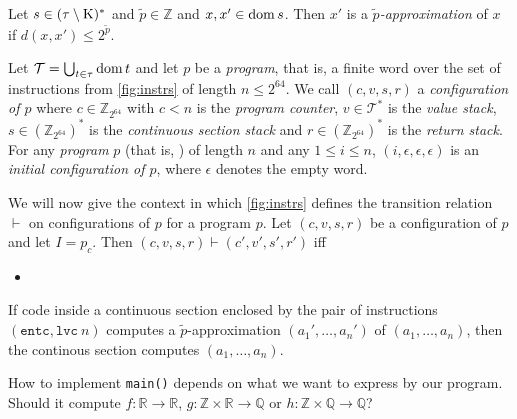 \documentclass[a4paper,parskip=half]{scrartcl}
\begin{document}
Let $s\in(\tau\setminus\text K)^*$ and $\tilde p\in\mathbb Z$ and $x,x'\in\operatorname{dom} s$.
Then $x'$ is a \emph{$\tilde p$-approximation} of $x$ if
$d(x,x')\leq2^{\tilde p}$.

Let $\mathcal T=\bigcup_{t\in\tau}\operatorname{dom} t$ and let $p$ be a \emph{program}, that
is, a finite word over the set of
instructions from \cref{fig:instrs} of length $n\leq 2^{64}$.
We call $(c,v,s,r)$
a \emph{configuration of $p$} where $c\in\mathbb Z_{2^{64}}$ with $c<n$ is the
\emph{program counter}, $v\in\mathcal T^*$ is the
\emph{value stack}, $s\in(\mathbb Z_{2^{64}})^*$ is the \emph{continuous section
stack} and $r\in(\mathbb Z_{2^{64}})^*$ is the
\emph{return stack}.
For any \emph{program} $p$ (that is, ) of length $n$ and any $1\leq i\leq n$,
$(i,\epsilon,\epsilon,\epsilon)$ is an \emph{initial configuration of $p$},
where $\epsilon$ denotes the empty word.

We will now give the context in which \cref{fig:instrs} defines the transition
relation $\vdash$ on configurations of $p$ for a program $p$. Let $(c,v,s,r)$ be
a configuration of $p$ and let $I=p_c$.
Then $(c,v,s,r)\vdash(c',v',s',r')$ iff
\begin{itemize}
\item
\end{itemize}




If code inside a continuous section enclosed by the pair of instructions
$(\texttt{entc},\texttt{lvc}~n)$ computes a $\tilde p$-approximation
$(a_1',\ldots,a_n')$ of $(a_1,\ldots,a_n)$, then the continous section computes
$(a_1,\ldots,a_n)$.

\newpage

How to implement \verb!main()! depends on what we want to express by our
program. Should it compute $f:\mathbb R\to\mathbb R$,
$g:\mathbb Z\times\mathbb R\to\mathbb Q$ or
$h:\mathbb Z\times\mathbb Q\to\mathbb Q$?
\end{document}
